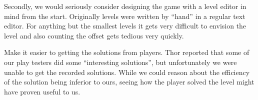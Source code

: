 Secondly, we would seriously consider designing the game with a level
editor in mind from the start.  Originally levels were written by
``hand'' in a regular text editor.  For anything but the smallest
levels it gets very difficult to envision the level and also counting
the offset gets tedious very quickly.

Make it easier to getting the solutions from players.  Thor reported
that some of our play testers did some ``interesting solutions'', but
unfortunately we were unable to get the recorded solutions.  While we
could reason about the efficiency of the solution being inferior to
ours, seeing how the player solved the level might have proven useful
to us.

